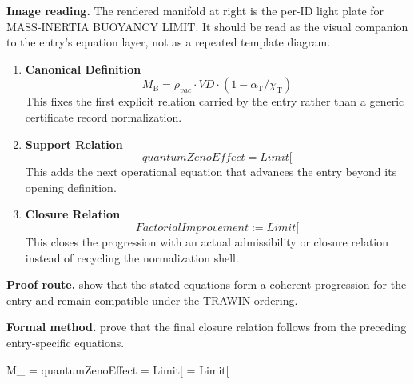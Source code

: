 \begin{samepage}
\noindent\begin{minipage}[t]{0.45\linewidth}
\vspace{0pt}
\raggedright
\scriptsize\textbf{Image reading.} The rendered manifold at right is the per-ID light plate for MASS-INERTIA BUOYANCY LIMIT. It should be read as the visual companion to the entry's equation layer, not as a repeated template diagram.\par
\end{minipage}\hfill
\begin{minipage}[t]{0.53\linewidth}
\vspace*{-0.10in}
\raggedright
{}
\end{minipage}
\end{samepage}

\clearpage


\begin{enumerate}[leftmargin=1.6em,itemsep=9pt,topsep=6pt]
\item \textbf{Canonical Definition}
\[
M_{\mathrm{B}} = \rho_{vac} \cdot VD \cdot (1 - \alpha_{\mathrm{T}}/\chi_{\mathrm{T}})
\]
This fixes the first explicit relation carried by the entry rather than a generic certificate record normalization.

\item \textbf{Support Relation}
\[
quantumZenoEffect = Limit[
\]
This adds the next operational equation that advances the entry beyond its opening definition.

\item \textbf{Closure Relation}
\[
FactorialImprovement := Limit[
\]
This closes the progression with an actual admissibility or closure relation instead of recycling the normalization shell.
\end{enumerate}

\textbf{Proof route.} show that the stated equations form a coherent progression for the entry and remain compatible under the TRAWIN ordering.

\textbf{Formal method.} prove that the final closure relation follows from the preceding entry-specific equations.

\medskip
{}

\begin{tzpsnapshot}
\end{tzpsnapshot}

\tzpequationlinks
  {M_{} = \cdots}
  {quantumZenoEffect = Limit[}
  {= Limit[}

